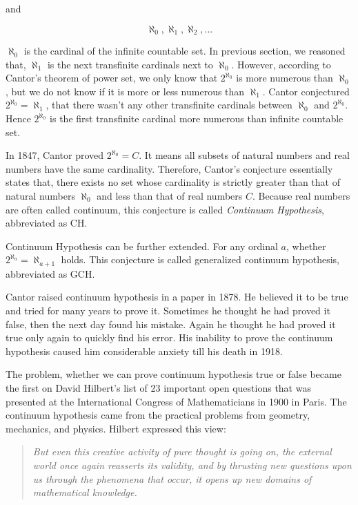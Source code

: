 \documentclass{article}
\begin{document}
and

\[
\aleph_0, \aleph_1, \aleph_2, ...
\]

$\aleph_0$ is the cardinal of the infinite countable set. In previous section, we reasoned that, $\aleph_1$ is the next transfinite cardinals next to $\aleph_0$. However, according to Cantor's theorem of power set, we only know that $2^{\aleph_0}$ is more numerous than $\aleph_0$, but we do not know if it is more or less numerous than $\aleph_1$. Cantor conjectured $2^{\aleph_0} = \aleph_1$, that there wasn't any other transfinite cardinals between $\aleph_0$ and $2^{\aleph_0}$. Hence $2^{\aleph_0}$ is the first transfinite cardinal more numerous than infinite countable set.

In 1847, Cantor proved $2^{\aleph_0} = C$. It means all subsets of natural numbers and real numbers have the same cardinality. Therefore, Cantor's conjecture essentially states that, there exists no set whose cardinality is strictly greater than that of natural numbers $\aleph_0$ and less than that of real numbers $C$. Because real numbers are often called continuum, this conjecture is called {\em Continuum Hypothesis}, abbreviated as CH.

Continuum Hypothesis can be further extended. For any ordinal $a$, whether $2^{\aleph_a} = \aleph_{a+1}$ holds. This conjecture is called generalized continuum hypothesis, abbreviated as GCH.

Cantor raised continuum hypothesis in a paper in 1878. He believed it to be true and tried for many years to prove it. Sometimes he thought he had proved it false, then the next day found his mistake. Again he thought he had proved it true only again to quickly find his error. His inability to prove the continuum hypothesis caused him considerable anxiety till his death in 1918.

The problem, whether we can prove continuum hypothesis true or false became the first on David Hilbert's list of 23 important open questions that was presented at the International Congress of Mathematicians in 1900 in Paris. The continuum hypothesis came from the practical problems from geometry, mechanics, and physics. Hilbert expressed this view:

\begin{quotation}
\itshape
But even this creative activity of pure thought is going on, the external world once again reasserts its validity, and by thrusting new questions upon us through the phenomena that occur, it opens up new domains of mathematical knowledge.
\end{quotation}
\end{document}
